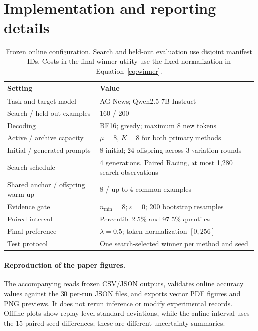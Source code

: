 \documentclass{article}
\begin{document}
\clearpage
\appendix
\section{Implementation and reporting details}
\label{app:details}
\begin{table}[htbp]\centering\small
\caption{Frozen online configuration. Search and held-out evaluation use disjoint
manifest IDs. Costs in the final winner utility use the fixed normalization
in Equation~\ref{eq:winner}.}
\begin{tabularx}{\linewidth}{@{}lX@{}}\toprule
Setting & Value\\\midrule
Task and target model & AG News; Qwen2.5-7B-Instruct\\
Search / held-out examples & 160 / 200\\
Decoding & BF16; greedy; maximum 8 new tokens\\
Active / archive capacity & $\mu=8$, $K=8$ for both primary methods\\
Initial / generated prompts & 8 initial; 24 offspring across 3 variation rounds\\
Search schedule & 4 generations, Paired Racing, at most 1,280 search observations\\
Shared anchor / offspring warm-up & 8 / up to 4 common examples\\
Evidence gate & $n_{\min}=8$; $\varepsilon=0$; 200 bootstrap resamples\\
Paired interval & Percentile 2.5\% and 97.5\% quantiles\\
Final preference & $\lambda=0.5$; token normalization $[0,256]$\\
Test protocol & One search-selected winner per method and seed\\\bottomrule
\end{tabularx}
\end{table}

\paragraph{Reproduction of the paper figures.}
The accompanying  reads frozen CSV/JSON outputs,
validates online accuracy values against the 30 per-run JSON files, and exports
vector PDF figures and PNG previews. It does not rerun inference or modify
experimental records. Offline plots show replay-level standard deviations,
while the online interval uses the 15 paired seed differences; these are
different uncertainty summaries.


\end{document}
